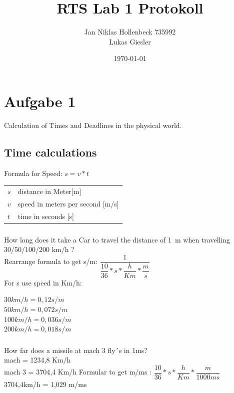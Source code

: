\documentclass{article}
\title{RTS Lab 1 Protokoll} %
\author{Jan Niklas Hollenbeck 735992 \\ Lukas Giesler} %
\date{\today} %
\begin{document}
\maketitle %



\section{Aufgabe 1}

Calculation of Times and Deadlines in the physical world.


\subsection{Time calculations}
Formula for Speed:  $s = v*t$\\

\begin{tabular}{ll}
$s$ & distance in Meter[m]\\
$v$ & speed in meters per second [m/s]\\
$t$ & time in seconds [s]\\
\end{tabular}


\subsubsection{}
How long does it take a Car to travel the distance of \SI{1}{\meter} when travelling 30/50/100/200 km/h ?\\
Rearrange formula to get s/m: $\dfrac{1}{\dfrac{10}{36} * s * \dfrac{h}{Km}  * \dfrac{m}{s}}$\\
For s use speed in Km/h:

$30km/h = 0,12 s/m$\\
$50km/h = 0,072 s/m$\\
$100km/h = 0,036 s/m$\\
$200km/h = 0,018 s/m$\\
\subsubsection{}
How far does a missile at mach 3 fly´s in 1ms?\\
mach = 1234,8 Km/h \\
mach 3 = 3704,4 Km/h
Formular to get m/ms : $\dfrac{10}{36} * s * \dfrac{h}{Km}  * \dfrac{m}{1000ms}$\\
3704,4km/h = 1,029 m/ms
\end{document}
